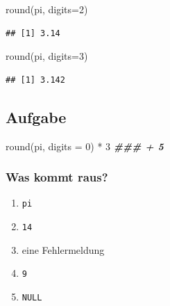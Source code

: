 \documentclass[
]{book}
\newenvironment{Shaded}{\begin{snugshade}}{\end{snugshade}}
\newcommand{\AttributeTok}[1]{\textcolor[rgb]{0.77,0.63,0.00}{#1}}
\newcommand{\DecValTok}[1]{\textcolor[rgb]{0.00,0.00,0.81}{#1}}
\newcommand{\DocumentationTok}[1]{\textcolor[rgb]{0.56,0.35,0.01}{\textbf{\textit{#1}}}}
\newcommand{\FunctionTok}[1]{\textcolor[rgb]{0.00,0.00,0.00}{#1}}
\newcommand{\NormalTok}[1]{#1}
\newcommand{\SpecialCharTok}[1]{\textcolor[rgb]{0.00,0.00,0.00}{#1}}
\providecommand{\tightlist}{%
  \setlength{\itemsep}{0pt}\setlength{\parskip}{0pt}}
\begin{document}
\begin{Shaded}
\begin{Highlighting}[]
\FunctionTok{round}\NormalTok{(pi, }\AttributeTok{digits=}\DecValTok{2}\NormalTok{)}
\end{Highlighting}
\end{Shaded}

\begin{verbatim}
## [1] 3.14
\end{verbatim}

\begin{Shaded}
\begin{Highlighting}[]
\FunctionTok{round}\NormalTok{(pi, }\AttributeTok{digits=}\DecValTok{3}\NormalTok{)}
\end{Highlighting}
\end{Shaded}

\begin{verbatim}
## [1] 3.142
\end{verbatim}

\hypertarget{aufgabe}{%
\subsection*{Aufgabe}\label{aufgabe}}

\begin{Shaded}
\begin{Highlighting}[]
\FunctionTok{round}\NormalTok{(pi, }\AttributeTok{digits =} \DecValTok{0}\NormalTok{) }\SpecialCharTok{*} \DecValTok{3} \DocumentationTok{\#\#\# + 5}
\end{Highlighting}
\end{Shaded}

\hypertarget{was-kommt-raus}{%
\subsubsection*{Was kommt raus?}\label{was-kommt-raus}}

\begin{enumerate}
\def\labelenumi{\Alph{enumi})}
\tightlist
\item
  \texttt{pi}
\item
  \texttt{14}
\item
  eine Fehlermeldung
\item
  \texttt{9}
\item
  \texttt{NULL}
\end{enumerate}
\end{document}
